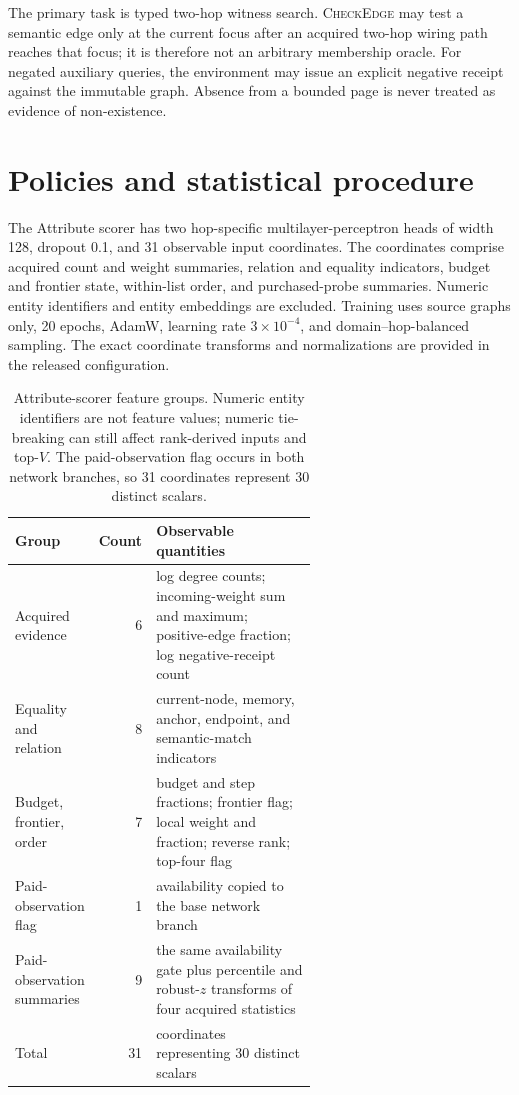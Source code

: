 \documentclass{article}
\begin{document}
The primary task is typed two-hop witness search. \textsc{CheckEdge} may test a
semantic edge only at the current focus after an acquired two-hop wiring path
reaches that focus; it is therefore not an arbitrary membership oracle. For
negated auxiliary queries, the environment may issue an explicit negative
receipt against the immutable graph. Absence from a bounded page is never
treated as evidence of non-existence.

\section{Policies and statistical procedure}
\label{app:policy-details}

The Attribute scorer has two hop-specific multilayer-perceptron heads of width 128,
dropout 0.1, and 31 observable input coordinates. The coordinates comprise
acquired count and weight summaries, relation and equality indicators, budget
and frontier state, within-list order, and purchased-probe summaries. Numeric
entity identifiers and entity embeddings are excluded. Training uses source
graphs only, 20 epochs, AdamW, learning rate $3\times10^{-4}$, and
domain--hop-balanced sampling. The exact coordinate transforms and normalizations are provided in the released
configuration.

\begin{table}[h]
\caption{Attribute-scorer feature groups. Numeric entity identifiers are not
feature values; numeric tie-breaking can still affect rank-derived inputs and
top-$V$. The paid-observation flag occurs in both network branches,
so 31 coordinates represent 30 distinct scalars.}
\label{tab:features}
\centering\scriptsize
\setlength{\tabcolsep}{3pt}
\begin{tabular}{lrp{0.60\linewidth}}
\toprule
Group & Count & Observable quantities \\
\midrule
Acquired evidence & 6 & log degree counts; incoming-weight sum and maximum; positive-edge fraction; log negative-receipt count \\
Equality and relation & 8 & current-node, memory, anchor, endpoint, and semantic-match indicators \\
Budget, frontier, order & 7 & budget and step fractions; frontier flag; local weight and fraction; reverse rank; top-four flag \\
Paid-observation flag & 1 & availability copied to the base network branch \\
Paid-observation summaries & 9 & the same availability gate plus percentile and robust-$z$ transforms of four acquired statistics \\
\midrule
Total & 31 & coordinates representing 30 distinct scalars \\
\bottomrule
\end{tabular}
\end{table}
\end{document}
